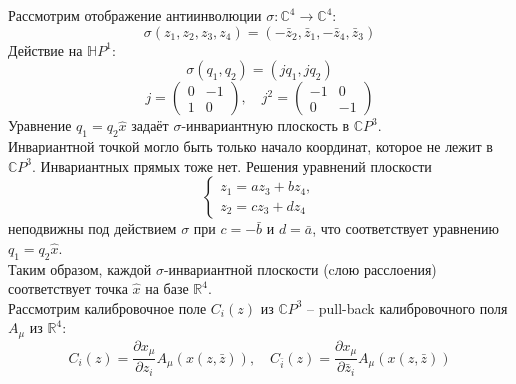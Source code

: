 \documentclass[12pt]{article}
\theoremstyle{definition}
\begin{document}
Рассмотрим отображение антиинволюции $\sigma:\mathbb{C}^4\rightarrow\mathbb{C}^4$:
\begin{equation}
    \sigma(z_1,z_2,z_3,z_4)=(-\bar{z}_2,\bar{z}_1,-\bar{z}_4,\bar{z}_3)
\end{equation}
Действие на $\mathbb{H}P^1$:
\begin{equation}
    \sigma(q_1,q_2)=(jq_1,jq_2)
\end{equation}
\begin{equation}
    j=\begin{pmatrix}
        0 & -1\\
        1 & 0
    \end{pmatrix},\quad j^2=\begin{pmatrix}
        -1 & 0\\
        0 & -1
    \end{pmatrix}
\end{equation}
Уравнение $q_1=q_2\hat{x}$ задаёт $\sigma$-инвариантную плоскость в $\mathbb{C}P^3$.\\ Инвариантной точкой могло быть только начало координат, которое не лежит в $\mathbb{C}P^3$. Инвариантных прямых тоже нет. Решения уравнений плоскости
\begin{equation}
    \begin{cases}
        z_1=az_3+bz_4,\\
        z_2=cz_3+dz_4
    \end{cases}
\end{equation}
неподвижны под действием $\sigma$ при $c=-\bar{b}$ и $d=\bar{a}$, что соответствует уравнению $q_1=q_2\hat{x}$.\\
Таким образом, каждой $\sigma$-инвариантной плоскости (cлою расслоения) соответствует точка $\hat{x}$ на базе $\mathbb{R}^4$.\\
Рассмотрим калибровочное поле $C_i(z)$ из $\mathbb{C}P^3$ -- pull-back калибровочного поля $A_\mu$ из $\mathbb{R}^4$:
\begin{equation}
    C_i(z)=\frac{\partial x_\mu}{\partial z_i}A_\mu(x(z,\bar{z})),\quad C_{\bar{i}}(z)=\frac{\partial x_\mu}{\partial\bar{z}_i}A_\mu(x(z,\bar{z}))
\end{equation}
\end{document}

